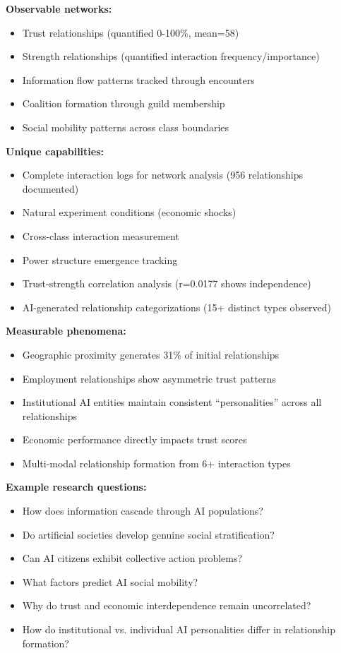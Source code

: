 \documentclass[11pt,a4paper]{article}
\begin{document}
\textbf{Observable networks:}
\begin{itemize}
\item Trust relationships (quantified 0-100\%, mean=58)
\item Strength relationships (quantified interaction frequency/importance)
\item Information flow patterns tracked through encounters
\item Coalition formation through guild membership
\item Social mobility patterns across class boundaries
\end{itemize}

\textbf{Unique capabilities:}
\begin{itemize}
\item Complete interaction logs for network analysis (956 relationships documented)
\item Natural experiment conditions (economic shocks)
\item Cross-class interaction measurement
\item Power structure emergence tracking
\item Trust-strength correlation analysis (r=0.0177 shows independence)
\item AI-generated relationship categorizations (15+ distinct types observed)
\end{itemize}

\textbf{Measurable phenomena:}
\begin{itemize}
\item Geographic proximity generates 31\% of initial relationships
\item Employment relationships show asymmetric trust patterns
\item Institutional AI entities maintain consistent ``personalities'' across all relationships
\item Economic performance directly impacts trust scores
\item Multi-modal relationship formation from 6+ interaction types
\end{itemize}

\textbf{Example research questions:}
\begin{itemize}
\item How does information cascade through AI populations?
\item Do artificial societies develop genuine social stratification?
\item Can AI citizens exhibit collective action problems?
\item What factors predict AI social mobility?
\item Why do trust and economic interdependence remain uncorrelated?
\item How do institutional vs. individual AI personalities differ in relationship formation?
\end{itemize}
\end{document}

